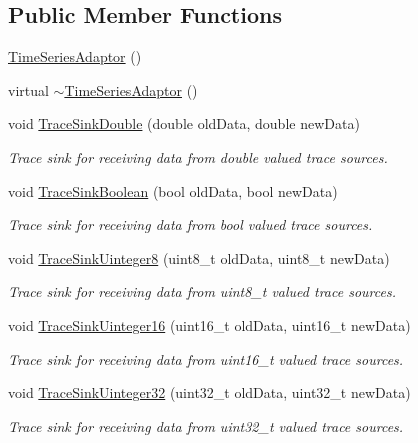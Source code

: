 \subsection*{Public Member Functions}
\begin{DoxyCompactItemize}
\item 
\hyperlink{classns3_1_1TimeSeriesAdaptor_a25c7a3aad8023ff211c9e70835150417}{Time\+Series\+Adaptor} ()
\item 
virtual \hyperlink{classns3_1_1TimeSeriesAdaptor_a8742439ff715f56aa8feb591738fd3c2}{$\sim$\+Time\+Series\+Adaptor} ()
\item 
void \hyperlink{classns3_1_1TimeSeriesAdaptor_a7b5499ffc99cfe741948166ede81980a}{Trace\+Sink\+Double} (double old\+Data, double new\+Data)
\begin{DoxyCompactList}\small\item\em Trace sink for receiving data from double valued trace sources. \end{DoxyCompactList}\item 
void \hyperlink{classns3_1_1TimeSeriesAdaptor_a85bb6303947154ffeefb4ab5c96c7bc3}{Trace\+Sink\+Boolean} (bool old\+Data, bool new\+Data)
\begin{DoxyCompactList}\small\item\em Trace sink for receiving data from bool valued trace sources. \end{DoxyCompactList}\item 
void \hyperlink{classns3_1_1TimeSeriesAdaptor_a5f8fb38787207ef1b0cedc841bec7ff8}{Trace\+Sink\+Uinteger8} (uint8\+\_\+t old\+Data, uint8\+\_\+t new\+Data)
\begin{DoxyCompactList}\small\item\em Trace sink for receiving data from uint8\+\_\+t valued trace sources. \end{DoxyCompactList}\item 
void \hyperlink{classns3_1_1TimeSeriesAdaptor_ae292de4e1a29362d3ee5e26150244cb6}{Trace\+Sink\+Uinteger16} (uint16\+\_\+t old\+Data, uint16\+\_\+t new\+Data)
\begin{DoxyCompactList}\small\item\em Trace sink for receiving data from uint16\+\_\+t valued trace sources. \end{DoxyCompactList}\item 
void \hyperlink{classns3_1_1TimeSeriesAdaptor_add04eee090a86dc859b2415710c85b30}{Trace\+Sink\+Uinteger32} (uint32\+\_\+t old\+Data, uint32\+\_\+t new\+Data)
\begin{DoxyCompactList}\small\item\em Trace sink for receiving data from uint32\+\_\+t valued trace sources. \end{DoxyCompactList}\end{DoxyCompactItemize}
